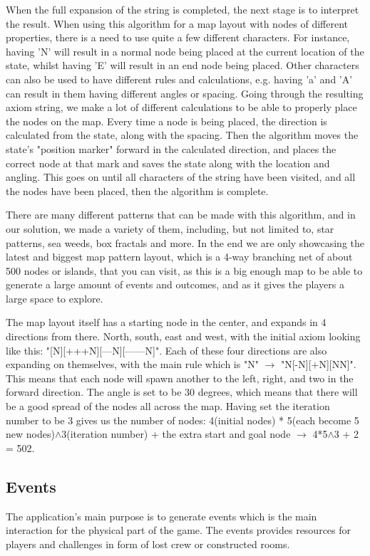 When the full expansion of the string is completed, the next stage is to interpret the result. When using this algorithm for a map layout with nodes of different properties, there is a need to use quite a few different characters. For instance, having 'N' will result in a normal node being placed at the current location of the state, whilst having 'E' will result in an end node being placed. Other characters can also be used to have different rules and calculations, e.g. having 'a' and 'A' can result in them having different angles or spacing.
Going through the resulting axiom string, we make a lot of different calculations to be able to properly place the nodes on the map. Every time a node is being placed, the direction is calculated from the state, along with the spacing. Then the algorithm moves the state's "position marker" forward in the calculated direction, and places the correct node at that mark and saves the state along with the location and angling.
This goes on until all characters of the string have been visited, and all the nodes have been placed, then the algorithm is complete.

There are many different patterns that can be made with this algorithm, and in our solution, we made a variety of them, including, but not limited to, star patterns, sea weeds, box fractals and more. 
In the end we are only showcasing the latest and biggest map pattern layout, which is a 4-way branching net of about 500 nodes or islands, that you can visit, as this is a big enough map to be able to generate a large amount of events and outcomes, and as it gives the players a large space to explore.

The map layout itself has a starting node in the center, and expands in 4 directions from there. North, south, east and west, with the initial axiom looking like this: "[N][+++N][---N][------N]". Each of these four directions are also expanding on themselves, with the main rule which is "N" $\rightarrow$ "N[-N][+N][NN]". This means that each node will spawn another to the left, right, and two in the forward direction. The angle is set to be 30 degrees, which means that there will be a good spread of the nodes all across the map. Having set the iteration number to be 3 gives us the number of nodes: 4(initial nodes) * 5(each become 5 new nodes)$\wedge$3(iteration number) + the extra start and goal node $\rightarrow$ 4*5$\wedge$3 + 2 = 502.

\subsection{Events}
The application's main purpose is to generate events which is the main interaction for the physical part of the game. The events provides resources for players and challenges in form of lost crew or constructed rooms.

